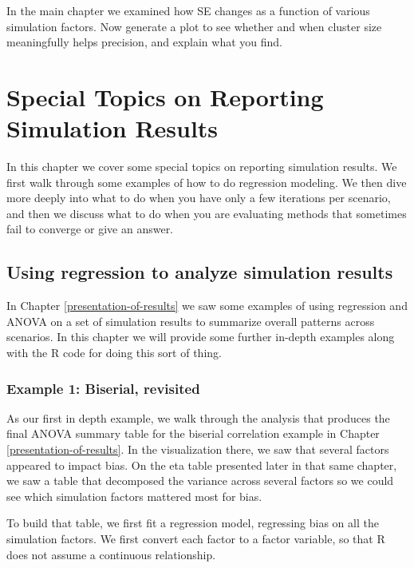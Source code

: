 \documentclass[
]{book}
\begin{document}
In the main chapter we examined how SE changes as a function of various simulation factors.
Now generate a plot to see whether and when cluster size meaningfully helps precision, and explain what you find.

\chapter{Special Topics on Reporting Simulation Results}\label{special-topics-on-reporting-simulation-results}

In this chapter we cover some special topics on reporting simulation results.
We first walk through some examples of how to do regression modeling.
We then dive more deeply into what to do when you have only a few iterations per scenario, and then we discuss what to do when you are evaluating methods that sometimes fail to converge or give an answer.

\section{Using regression to analyze simulation results}\label{using-regression-to-analyze-simulation-results}

In Chapter \ref{presentation-of-results} we saw some examples of using regression and ANOVA on a set of simulation results to summarize overall patterns across scenarios.
In this chapter we will provide some further in-depth examples along with the R code for doing this sort of thing.

\subsection{Example 1: Biserial, revisited}\label{example-1-biserial-revisited-1}

As our first in depth example, we walk through the analysis that produces the final ANOVA summary table for the biserial correlation example in Chapter \ref{presentation-of-results}.
In the visualization there, we saw that several factors appeared to impact bias.
On the eta table presented later in that same chapter, we saw a table that decomposed the variance across several factors so we could see which simulation factors mattered most for bias.

To build that table, we first fit a regression model, regressing bias on all the simulation factors.
We first convert each factor to a factor variable, so that R does not assume a continuous relationship.
\end{document}
